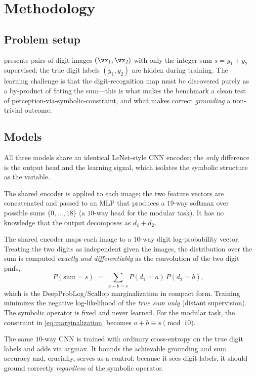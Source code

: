 \section{Methodology}
\label{sec:method}

\subsection{Problem setup}
\mnistadd presents pairs of digit images $(\vx_1,\vx_2)$ with only the integer sum
$s = y_1 + y_2$ supervised; the true digit labels $(y_1,y_2)$ are hidden during training. The learning
challenge is that the digit-recognition map must be discovered purely as a by-product of fitting the
sum---this is what makes the benchmark a clean test of perception-via-symbolic-constraint, and what
makes correct \emph{grounding} a non-trivial outcome.

\subsection{Models}
All three models share an identical LeNet-style CNN encoder; the \emph{only} difference is the output
head and the learning signal, which isolates the symbolic structure as the variable.

 The shared encoder is applied to each image; the two feature vectors are
concatenated and passed to an MLP that produces a $19$-way softmax over possible sums $\{0,\dots,18\}$
(a $10$-way head for the modular task). It has no knowledge that the output decomposes as $d_1{+}d_2$.

 The shared encoder maps each image to a $10$-way digit
log-probability vector. Treating the two digits as independent given the images, the distribution over
the sum is computed \emph{exactly and differentiably} as the convolution of the two digit pmfs,
\begin{equation}
\label{eq:marginalization}
P(\text{sum}=s) \;=\; \sum_{a+b=s} P(d_1{=}a)\,P(d_2{=}b),
\end{equation}
which is the DeepProbLog/Scallop marginalization in compact form. Training minimizes the negative
log-likelihood of the \emph{true sum only} (distant supervision). The symbolic operator is fixed and
never learned. For the modular task, the constraint in \eqref{eq:marginalization} becomes
$a{+}b\equiv s \pmod{10}$.

 The same $10$-way CNN is trained with ordinary cross-entropy on the true
digit labels and adds via argmax. It bounds the achievable grounding and sum accuracy and, crucially,
serves as a control: because it sees digit labels, it should ground correctly \emph{regardless} of the
symbolic operator.

